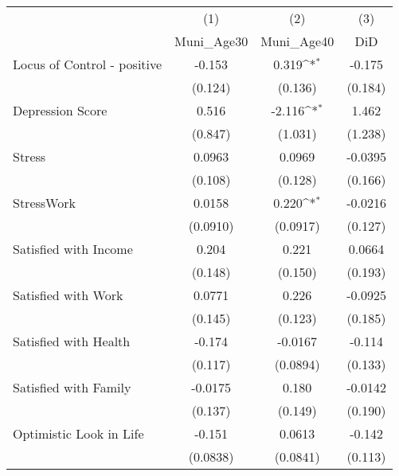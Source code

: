 {
\def\sym#1{\ifmmode^{#1}\else\(^{#1}\)\fi}
\begin{tabular}{l*{3}{c}}
\hline\hline
            &\multicolumn{1}{c}{(1)}&\multicolumn{1}{c}{(2)}&\multicolumn{1}{c}{(3)}\\
            &\multicolumn{1}{c}{Muni\_Age30}&\multicolumn{1}{c}{Muni\_Age40}&\multicolumn{1}{c}{DiD}\\
\hline
Locus of Control - positive&      -0.153         &       0.319\sym{*}  &      -0.175         \\
            &     (0.124)         &     (0.136)         &     (0.184)         \\
[1em]
Depression Score&       0.516         &      -2.116\sym{*}  &       1.462         \\
            &     (0.847)         &     (1.031)         &     (1.238)         \\
[1em]
Stress      &      0.0963         &      0.0969         &     -0.0395         \\
            &     (0.108)         &     (0.128)         &     (0.166)         \\
[1em]
StressWork  &      0.0158         &       0.220\sym{*}  &     -0.0216         \\
            &    (0.0910)         &    (0.0917)         &     (0.127)         \\
[1em]
Satisfied with Income&       0.204         &       0.221         &      0.0664         \\
            &     (0.148)         &     (0.150)         &     (0.193)         \\
[1em]
Satisfied with Work&      0.0771         &       0.226         &     -0.0925         \\
            &     (0.145)         &     (0.123)         &     (0.185)         \\
[1em]
Satisfied with Health&      -0.174         &     -0.0167         &      -0.114         \\
            &     (0.117)         &    (0.0894)         &     (0.133)         \\
[1em]
Satisfied with Family&     -0.0175         &       0.180         &     -0.0142         \\
            &     (0.137)         &     (0.149)         &     (0.190)         \\
[1em]
Optimistic Look in Life&      -0.151         &      0.0613         &      -0.142         \\
            &    (0.0838)         &    (0.0841)         &     (0.113)         \\

\end{tabular}}
